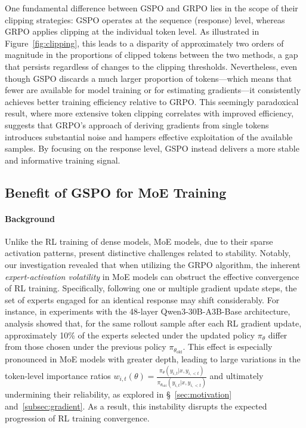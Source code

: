 One fundamental difference between GSPO and GRPO lies in the scope of their clipping strategies: GSPO operates at the sequence (response) level, whereas GRPO applies clipping at the individual token level. As illustrated in Figure~\ref{fig:clipping}, this leads to a disparity of approximately two orders of magnitude in the proportions of clipped tokens between the two methods, a gap that persists regardless of changes to the clipping thresholds. Nevertheless, even though GSPO discards a much larger proportion of tokens—which means that fewer are available for model training or for estimating gradients—it consistently achieves better training efficiency relative to GRPO. This seemingly paradoxical result, where more extensive token clipping correlates with improved efficiency, suggests that GRPO’s approach of deriving gradients from single tokens introduces substantial noise and hampers effective exploitation of the available samples. By focusing on the response level, GSPO instead delivers a more stable and informative training signal.

\subsection{Benefit of GSPO for MoE Training}
\label{subsec:routing_replay}

\paragraph{Background}
Unlike the RL training of dense models, MoE models, due to their sparse activation patterns, present distinctive challenges related to stability. Notably, our investigation revealed that when utilizing the GRPO algorithm, the inherent \textit{expert-activation volatility} in MoE models can obstruct the effective convergence of RL training. Specifically, following one or multiple gradient update steps, the set of experts engaged for an identical response may shift considerably. For instance, in experiments with the 48-layer Qwen3-30B-A3B-Base architecture, analysis showed that, for the same rollout sample after each RL gradient update, approximately 10\% of the experts selected under the updated policy $\pi_{\theta}$ differ from those chosen under the previous policy $\pi_{\theta_\text{old}}$. This effect is especially pronounced in MoE models with greater depth, leading to large variations in the token-level importance ratios $w_{i,t}(\theta) = \frac{ \pi_{\theta} (y_{i,t} | x, y_{i,<t}) }{ \pi_{\theta_\text{old}} (y_{i,t} | x,y_{i,<t})}$ and ultimately undermining their reliability, as explored in \S~\ref{sec:motivation} and~\ref{subsec:gradient}. As a result, this instability disrupts the expected progression of RL training convergence.

